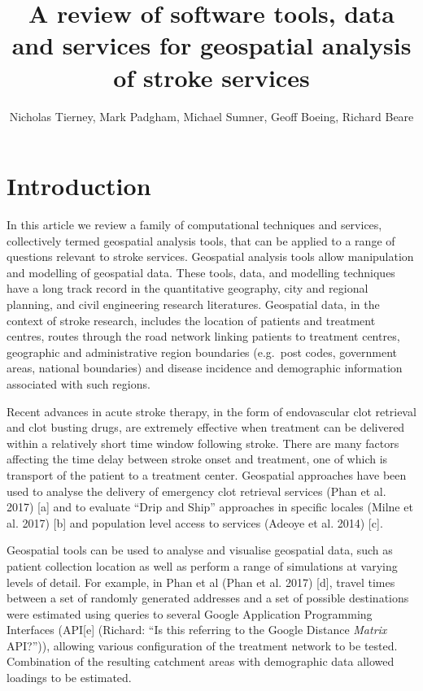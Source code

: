\documentclass[]{article}
\title{A review of software tools, data and services for geospatial analysis of
stroke services}
\author{Nicholas Tierney, Mark Padgham, Michael Sumner, Geoff Boeing, Richard
Beare}
\date{}
\begin{document}
\maketitle

\hypertarget{introduction}{%
\section{Introduction}\label{introduction}}

In this article we review a family of computational techniques and
services, collectively termed geospatial analysis tools, that can be
applied to a range of questions relevant to stroke services. Geospatial
analysis tools allow manipulation and modelling of geospatial data.
These tools, data, and modelling techniques have a long track record in
the quantitative geography, city and regional planning, and civil
engineering research literatures. Geospatial data, in the context of
stroke research, includes the location of patients and treatment
centres, routes through the road network linking patients to treatment
centres, geographic and administrative region boundaries (e.g.~post
codes, government areas, national boundaries) and disease incidence and
demographic information associated with such regions.

Recent advances in acute stroke therapy, in the form of endovascular
clot retrieval and clot busting drugs, are extremely effective when
treatment can be delivered within a relatively short time window
following stroke. There are many factors affecting the time delay
between stroke onset and treatment, one of which is transport of the
patient to a treatment center. Geospatial approaches have been used to
analyse the delivery of emergency clot retrieval services (Phan et al.
2017) {[}a{]} and to evaluate ``Drip and Ship'' approaches in specific
locales (Milne et al. 2017) {[}b{]} and population level access to
services (Adeoye et al. 2014) {[}c{]}.

Geospatial tools can be used to analyse and visualise geospatial data,
such as patient collection location as well as perform a range of
simulations at varying levels of detail. For example, in Phan et al
(Phan et al. 2017) {[}d{]}, travel times between a set of randomly
generated addresses and a set of possible destinations were estimated
using queries to several Google Application Programming Interfaces
(API{[}e{]} (Richard: ``Is this referring to the Google Distance
\emph{Matrix} API?'')), allowing various configuration of the treatment
network to be tested. Combination of the resulting catchment areas with
demographic data allowed loadings to be estimated.
\end{document}
